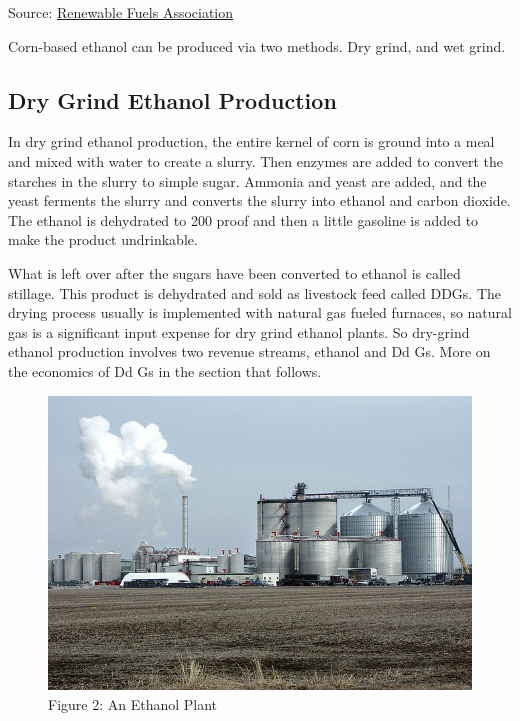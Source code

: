 \documentclass[]{book}
\theoremstyle{definition}
\theoremstyle{definition}
\theoremstyle{remark}
\begin{document}
Source:
\href{http://www.ethanolrfa.org/resources/biorefinery-locations/}{Renewable
Fuels Association}

Corn-based ethanol can be produced via two methods. Dry grind, and wet
grind.

\subsection{Dry Grind Ethanol
Production}\label{dry-grind-ethanol-production}

In dry grind ethanol production, the entire kernel of corn is ground
into a meal and mixed with water to create a slurry. Then enzymes are
added to convert the starches in the slurry to simple sugar. Ammonia and
yeast are added, and the yeast ferments the slurry and converts the
slurry into ethanol and carbon dioxide. The ethanol is dehydrated to 200
proof and then a little gasoline is added to make the product
undrinkable.

What is left over after the sugars have been converted to ethanol is
called stillage. This product is dehydrated and sold as livestock feed
called DDGs. The drying process usually is implemented with natural gas
fueled furnaces, so natural gas is a significant input expense for dry
grind ethanol plants. So dry-grind ethanol production involves two
revenue streams, ethanol and Dd Gs. More on the economics of Dd Gs in
the section that follows.

\begin{figure}[htbp]
\centering
\includegraphics{images/640px-Ethanol_plant.jpg}
\caption{Figure 2: An Ethanol Plant}
\end{figure}
\end{document}

